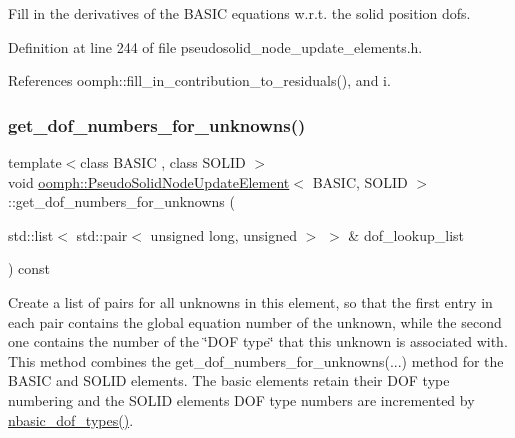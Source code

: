 Fill in the derivatives of the B\+A\+S\+IC equations w.\+r.\+t. the solid position dofs. 



Definition at line 244 of file pseudosolid\+\_\+node\+\_\+update\+\_\+elements.\+h.



References oomph\+::fill\+\_\+in\+\_\+contribution\+\_\+to\+\_\+residuals(), and i.

\mbox{\label{classoomph_1_1PseudoSolidNodeUpdateElement_a18101610910f61e68da44e0fedf68c2c}} 
\subsubsection{\texorpdfstring{get\+\_\+dof\+\_\+numbers\+\_\+for\+\_\+unknowns()}{get\_dof\_numbers\_for\_unknowns()}}
{\footnotesize\ttfamily template$<$class B\+A\+S\+IC , class S\+O\+L\+ID $>$ \\
void \hyperlink{classoomph_1_1PseudoSolidNodeUpdateElement}{oomph\+::\+Pseudo\+Solid\+Node\+Update\+Element}$<$ B\+A\+S\+IC, S\+O\+L\+ID $>$\+::get\+\_\+dof\+\_\+numbers\+\_\+for\+\_\+unknowns (\begin{DoxyParamCaption}\item[{std\+::list$<$ std\+::pair$<$ unsigned long, unsigned $>$ $>$ \&}]{dof\+\_\+lookup\+\_\+list }\end{DoxyParamCaption}) const\hspace{0.3cm}{\ttfamily [inline]}}



Create a list of pairs for all unknowns in this element, so that the first entry in each pair contains the global equation number of the unknown, while the second one contains the number of the \char`\"{}\+D\+O\+F type\char`\"{} that this unknown is associated with. This method combines the get\+\_\+dof\+\_\+numbers\+\_\+for\+\_\+unknowns(...) method for the B\+A\+S\+IC and S\+O\+L\+ID elements. The basic elements retain their D\+OF type numbering and the S\+O\+L\+ID elements D\+OF type numbers are incremented by \hyperlink{classoomph_1_1PseudoSolidNodeUpdateElement_a6fbeab78f1f6ebe9fc76625d88009e61}{nbasic\+\_\+dof\+\_\+types()}. 



